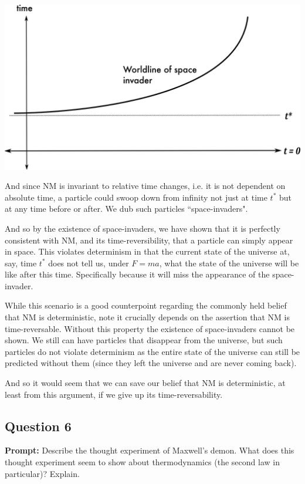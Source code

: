 \documentclass{article}
\begin{document}
\begin{center}
  \includegraphics[scale=0.18]{space-invader.jpg}  
\end{center}

And since NM is invariant to relative time changes, i.e. it is not dependent on absolute time, a particle could swoop down from infinity not just at time $t^*$ but at any time before or after. We dub such particles ``space-invaders".

And so by the existence of space-invaders, we have shown that it is perfectly consistent with NM, and its time-reversibility, that a particle can simply appear in space. This violates determinism in that the current state of the universe at, say, time $t^*$ does not tell us, under $F=ma$, what the state of the universe will be like after this time. Specifically because it will miss the appearance of the space-invader.

While this scenario is a good counterpoint regarding the commonly held belief that NM is deterministic, note it crucially depends on the assertion that NM is time-reversable. Without this property the existence of space-invaders cannot be shown. We still can have particles that disappear from the universe, but such particles do not violate determinism as the entire state of the universe can still be predicted without them (since they left the universe and are never coming back).

And so it would seem that we can save our belief that NM is deterministic, at least from this argument, if we give up its time-reversability.
\newpage

\subsection*{Question 6}
\noindent\textbf{Prompt:} Describe the thought experiment of Maxwell’s demon. What does this thought experiment seem to show about thermodynamics (the second law in particular)? Explain.
\bigskip
\end{document}
